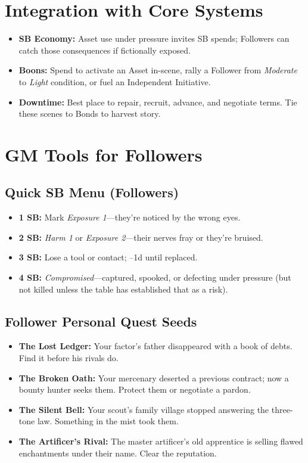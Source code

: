 \section{Integration with Core Systems}
\begin{itemize}
  \item \textbf{SB Economy:} Asset use under pressure invites SB spends; Followers can catch those consequences if fictionally exposed.
  \item \textbf{Boons:} Spend to activate an Asset in-scene, rally a Follower from \emph{Moderate} to \emph{Light} condition, or fuel an Independent Initiative.
  \item \textbf{Downtime:} Best place to repair, recruit, advance, and negotiate terms. Tie these scenes to Bonds to harvest story.
\end{itemize}

\section{GM Tools for Followers}

\subsection*{Quick SB Menu (Followers)}
\begin{itemize}
  \item \textbf{1 SB:} Mark \emph{Exposure 1}—they're noticed by the wrong eyes.
  \item \textbf{2 SB:} \emph{Harm 1} or \emph{Exposure 2}—their nerves fray or they're bruised.
  \item \textbf{3 SB:} Lose a tool or contact; –1d until replaced.
  \item \textbf{4 SB:} \emph{Compromised}—captured, spooked, or defecting under pressure (but not killed unless the table has established that as a risk).
\end{itemize}

\subsection*{Follower Personal Quest Seeds}
\begin{itemize}
  \item \textbf{The Lost Ledger:} Your factor’s father disappeared with a book of debts. Find it before his rivals do.
  \item \textbf{The Broken Oath:} Your mercenary deserted a previous contract; now a bounty hunter seeks them. Protect them or negotiate a pardon.
  \item \textbf{The Silent Bell:} Your scout’s family village stopped answering the three-tone law. Something in the mist took them.
  \item \textbf{The Artificer’s Rival:} The master artificer’s old apprentice is selling flawed enchantments under their name. Clear the reputation.
\end{itemize}

